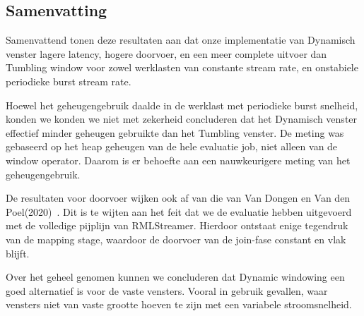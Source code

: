 \subsection{Samenvatting}
\label{sec:Result Summary}

Samenvattend tonen deze resultaten aan dat onze implementatie van Dynamisch venster 
lagere latency, hogere doorvoer, en een meer complete 
uitvoer dan Tumbling window voor zowel 
werklasten van constante stream rate, en onstabiele periodieke burst stream rate.

Hoewel het geheugengebruik daalde in de werklast met periodieke burst snelheid, konden we 
konden we niet met zekerheid concluderen dat het Dynamisch venster effectief minder geheugen gebruikte
dan het Tumbling venster. De meting was gebaseerd op het heap geheugen van de 
hele evaluatie job, niet alleen van de window operator. Daarom is er behoefte aan een 
nauwkeurigere meting van het geheugengebruik. 

De resultaten voor doorvoer wijken ook af van die van Van Dongen en Van den Poel(2020)~\cite{evalution_of_spe}. 
Dit is te wijten aan het feit dat we de evaluatie hebben uitgevoerd met de volledige pijplijn van RMLStreamer. Hierdoor ontstaat enige tegendruk van de mapping stage, 
waardoor de doorvoer van de join-fase constant en vlak blijft.    

Over het geheel genomen kunnen we concluderen dat Dynamic windowing een goed alternatief is voor de vaste 
vensters. Vooral in gebruik 
gevallen, waar vensters niet van vaste grootte hoeven te zijn met een variabele stroomsnelheid.  

